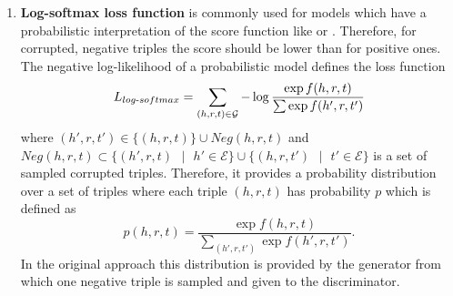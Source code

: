 \begin{enumerate}
    \item 
    \textbf{Log-softmax loss function} is commonly used for models which have a probabilistic interpretation of the score function like \distmult or \complex.
    Therefore, for corrupted, negative triples the score should be lower than for positive ones.
    The negative log-likelihood of a probabilistic model defines the loss function \cite{cai2017kbgan}
    \begin{equation} \label{eq:nllloss}
        L_{log\text{-}softmax}=\sum_{(h,r,t)\in\mathcal{G}}-\log \frac{\exp f(h,r,t)}{\sum\exp f(h',r,t')}
    \end{equation}
    where $(h',r,t') \in \{(h,r,t)\} \cup Neg(h,r,t)$ and $Neg(h,r,t) \subset \{(h',r,t) \text{ }|\text{ }h' \in \mathcal{E}\} \cup \{(h,r,t')\text{ } |\text{ }t' \in \mathcal{E}\}$ is a set of sampled corrupted triples.
    Therefore, it provides a probability distribution over a set of triples where each triple $(h, r, t)$ has probability $p$ which is defined as \cite{cai2017kbgan}
    \begin{equation}
        p(h,r,t) = \frac{\exp f(h,r,t)}{\sum_{(h',r,t')}\exp f(h',r,t')}.
    \end{equation}
    In the original \kbgan approach this distribution is provided by the generator from which one negative triple is sampled and given to the discriminator.
\end{enumerate}


